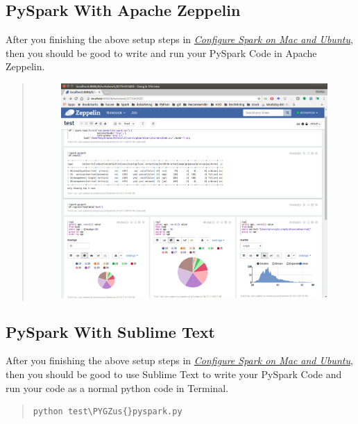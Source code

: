 \documentclass[letterpaper,11pt,english]{sphinxmanual}
\def\PYGZus{\char`\_}
\begin{document}
\subsection{PySpark With Apache Zeppelin}
\label{setup:pyspark-with-apache-zeppelin}
After you finishing the above setup steps in {\hyperref[setup:set-up-ubuntu]{\emph{Configure Spark on Mac and Ubuntu}}},
then you should be good to write and run your PySpark Code
in Apache Zeppelin.
\begin{quote}
\begin{figure}[htbp]
\centering

\includegraphics{zeppelin.png}
\label{setup:fig-zeppelin}\end{figure}
\end{quote}


\subsection{PySpark With Sublime Text}
\label{setup:pyspark-with-sublime-text}
After you finishing the above setup steps in {\hyperref[setup:set-up-ubuntu]{\emph{Configure Spark on Mac and Ubuntu}}},
then you should be good to use Sublime Text to write your PySpark
Code and run your code as a normal python code in Terminal.
\begin{quote}

\begin{Verbatim}[commandchars=\\\{\}]
python test\PYGZus{}pyspark.py
\end{Verbatim}
\end{quote}
\end{document}
